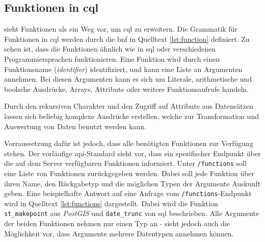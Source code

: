 \subsection{Funktionen in \ac{cql}}

 sieht Funktionen als ein Weg vor, um \ac{cql} zu erweitern. Die Grammatik
für Funktionen in \ac{cql} werden durch die \ac{bnf} in Quelltext \ref{lst:function} definiert.
Zu sehen ist, dass die Funktionen ähnlich wie in \ac{sql} oder verschiedenen Programmiersprachen
funktionieren. Eine Funktion wird durch einen Funktionsname (\textit{identifier})
identifiziert, und kann eine Liste an Argumenten annehmen. Bei diesen Argumenten kann es sich um
Literale, arithmetische und boolsche Ausdrücke, Arrays, Attribute oder weitere Funktionsaufrufe handeln.



Durch den rekursiven Charakter und den Zugriff auf Attribute aus Datensätzen lassen sich beliebig
komplexe Ausdrücke erstellen, welche zur Transformation und Auswertung von Daten
benutzt werden kann.

Vorraussetzung dafür ist jedoch, dass alle benötigten Funktionen zur Verfügung stehen. Der
vorläufige \ac{api}-Standard sieht vor, dass ein spezifischer Endpunkt über die auf dem Server
verfügbaren Funktionen informiert. Unter \texttt{/functions} soll eine Liste von Funktionen
zurückgegeben werden. Dabei soll jede Funktion über ihren Name, den Rückgabetyp und die möglichen
Typen der Argumente Auskunft geben. Eine beispielhafte Antwort auf eine Anfrage vom
\texttt{/functions}-Endpunkt wird in Quelltext \ref{lst:functions} dargestellt. Dabei wird die
Funktion \texttt{st\_makepoint} aus \textit{PostGIS} und \texttt{date\_trunc} von \ac{sql}
beschrieben. Alle Argumente der beiden Funktionen nehmen nur einen Typ an - 
sieht jedoch auch die Möglichkeit vor, dass Argumente mehrere Datentypen annehmen können.


